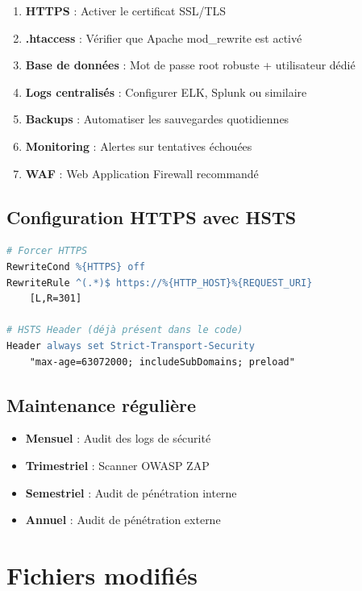 \documentclass[11pt,a4paper,french]{report}
\begin{document}
\begin{enumerate}
    \item \textbf{HTTPS} : Activer le certificat SSL/TLS
    \item \textbf{.htaccess} : Vérifier que Apache mod\_rewrite est activé
    \item \textbf{Base de données} : Mot de passe root robuste + utilisateur dédié
    \item \textbf{Logs centralisés} : Configurer ELK, Splunk ou similaire
    \item \textbf{Backups} : Automatiser les sauvegardes quotidiennes
    \item \textbf{Monitoring} : Alertes sur tentatives échouées
    \item \textbf{WAF} : Web Application Firewall recommandé
\end{enumerate}

\subsection{Configuration HTTPS avec HSTS}

\begin{lstlisting}[language=Apache]
# Forcer HTTPS
RewriteCond %{HTTPS} off
RewriteRule ^(.*)$ https://%{HTTP_HOST}%{REQUEST_URI} 
    [L,R=301]

# HSTS Header (déjà présent dans le code)
Header always set Strict-Transport-Security 
    "max-age=63072000; includeSubDomains; preload"
\end{lstlisting}

\subsection{Maintenance régulière}

\begin{itemize}
    \item \textbf{Mensuel} : Audit des logs de sécurité
    \item \textbf{Trimestriel} : Scanner OWASP ZAP
    \item \textbf{Semestriel} : Audit de pénétration interne
    \item \textbf{Annuel} : Audit de pénétration externe
\end{itemize}

\section{Fichiers modifiés}
\end{document}
